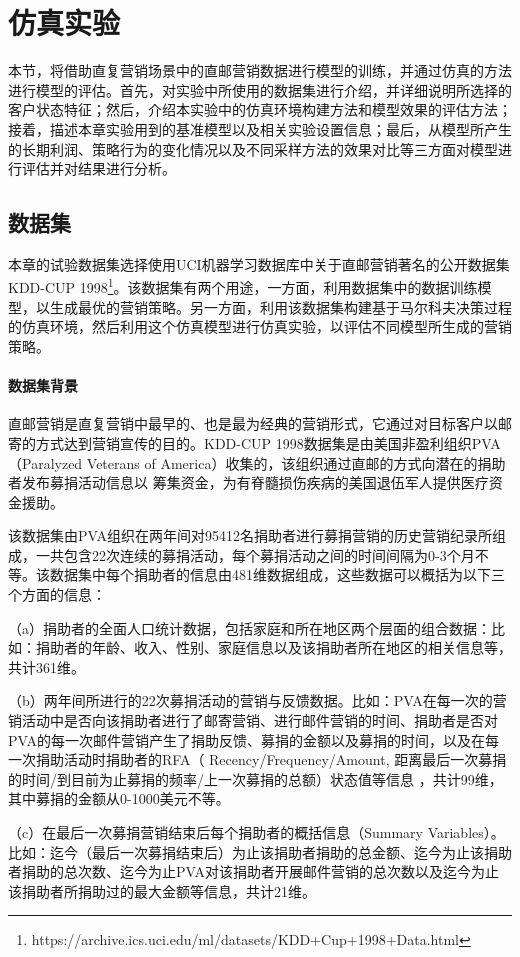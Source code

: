 \section{仿真实验}
本节，将借助直复营销场景中的直邮营销数据进行模型的训练，并通过仿真的方法进行模型的评估。首先，对实验中所使用的数据集进行介绍，并详细说明所选择的客户状态特征；然后，介绍本实验中的仿真环境构建方法和模型效果的评估方法；接着，描述本章实验用到的基准模型以及相关实验设置信息；最后，从模型所产生的长期利润、策略行为的变化情况以及不同采样方法的效果对比等三方面对模型进行评估并对结果进行分析。

\subsection{数据集}
本章的试验数据集选择使用UCI机器学习数据库中关于直邮营销著名的公开数据集KDD-CUP 1998\footnote{https://archive.ics.uci.edu/ml/datasets/KDD+Cup+1998+Data.html}。该数据集有两个用途，一方面，利用数据集中的数据训练模型，以生成最优的营销策略。另一方面，利用该数据集构建基于马尔科夫决策过程的仿真环境，然后利用这个仿真模型进行仿真实验，以评估不同模型所生成的营销策略。

\paragraph{数据集背景}
直邮营销是直复营销中最早的、也是最为经典的营销形式，它通过对目标客户以邮寄的方式达到营销宣传的目的。KDD-CUP 1998数据集是由美国非盈利组织PVA（Paralyzed Veterans of America）收集的，该组织通过直邮的方式向潜在的捐助者发布募捐活动信息以
筹集资金，为有脊髓损伤疾病的美国退伍军人提供医疗资金援助。

该数据集由PVA组织在两年间对95412名捐助者进行募捐营销的历史营销纪录所组成，一共包含22次连续的募捐活动，每个募捐活动之间的时间间隔为0-3个月不等。该数据集中每个捐助者的信息由481维数据组成，这些数据可以概括为以下三个方面的信息：

（a）捐助者的全面人口统计数据，包括家庭和所在地区两个层面的组合数据：比如：捐助者的年龄、收入、性别、家庭信息以及该捐助者所在地区的相关信息等，共计361维。

（b）两年间所进行的22次募捐活动的营销与反馈数据。比如：PVA在每一次的营销活动中是否向该捐助者进行了邮寄营销、进行邮件营销的时间、捐助者是否对PVA的每一次邮件营销产生了捐助反馈、募捐的金额以及募捐的时间，以及在每一次捐助活动时捐助者的RFA（ Recency/Frequency/Amount, 距离最后一次募捐的时间/到目前为止募捐的频率/上一次募捐的总额）状态值等信息 ，共计99维，其中募捐的金额从0-1000美元不等。

（c）在最后一次募捐营销结束后每个捐助者的概括信息（Summary Variables）。比如：迄今（最后一次募捐结束后）为止该捐助者捐助的总金额、迄今为止该捐助者捐助的总次数、迄今为止PVA对该捐助者开展邮件营销的总次数以及迄今为止该捐助者所捐助过的最大金额等信息，共计21维。

